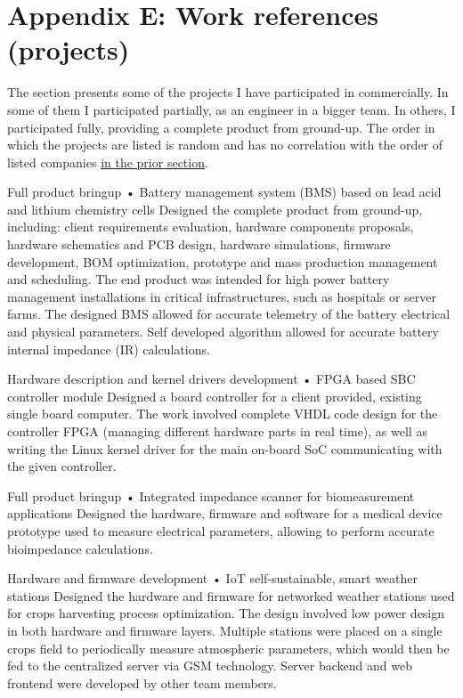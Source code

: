 \documentclass{tccv}
\begin{document}
\section{Appendix E: Work references (projects)}

The section presents some of the projects I have participated in commercially. In some of them I participated partially, as an engineer in a bigger team. In others, I participated fully, providing a complete product from ground-up. The order in which the projects are listed is random and has no correlation with the order of listed companies  \hyperref[sec:clients]{in the prior section}. \\

\begin{yearlist}

\item[Full product bringup]{•}
     {Battery management system (BMS) based on lead acid and lithium chemistry cells}
     {Designed the complete product from ground-up, including: client requirements evaluation, hardware components proposals, hardware schematics and PCB design, hardware simulations, firmware development, BOM optimization, prototype and mass production management and scheduling. The end product was intended for high power battery management installations in critical infrastructures, such as hospitals or server farms. The designed BMS allowed for accurate telemetry of the battery electrical and physical parameters. Self developed algorithm allowed for accurate battery internal impedance (IR) calculations.}
     
\item[Hardware description and kernel drivers development]{•}
     {FPGA based SBC controller module}
     {Designed a board controller for a client provided, existing single board computer. The work involved complete VHDL code design for the controller FPGA (managing different hardware parts in real time), as well as writing the Linux kernel driver for the main on-board SoC communicating with the given controller.}
     
\item[Full product bringup]{•}
     {Integrated impedance scanner for biomeasurement applications}
     {Designed the hardware, firmware and software for a medical device prototype used to measure electrical parameters, allowing to perform accurate bioimpedance calculations.}
     
\item[Hardware and firmware development]{•}
     {IoT self-sustainable, smart weather stations}
     {Designed the hardware and firmware for networked weather stations used for crops harvesting process optimization. The design involved low power design in both hardware and firmware layers. Multiple stations were placed on a single crops field to periodically measure atmospheric parameters, which would then be fed to the centralized server via GSM technology. Server backend and web frontend were developed by other team members.}
     

\end{yearlist}
\end{document}
